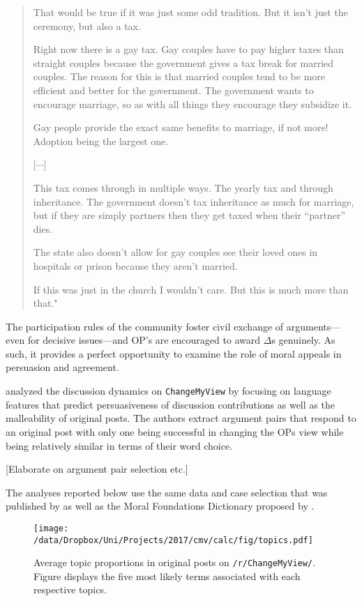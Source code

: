 \begin{quote}\singlespacing
That would be true if it was just some odd tradition. But it isn't just the ceremony, but also a tax.

Right now there is a gay tax. Gay couples have to pay higher taxes than straight couples because the government gives a tax break for married couples. The reason for this is that married couples tend to be more efficient and better for the government. The government wants to encourage marriage, so as with all things they encourage they subsidize it.

Gay people provide the exact same benefits to marriage, if not more! Adoption being the largest one.

[\hspace{.2em}$\cdots$]

This tax comes through in multiple ways. The yearly tax and through inheritance. The government doesn't tax inheritance as much for marriage, but if they are simply partners then they get taxed when their ``partner'' dies.

The state also doesn't allow for gay couples see their loved ones in hospitals or prison because they aren't married.

If this was just in the church I wouldn't care. But this is much more than that."
\end{quote}
The participation rules of the community foster civil exchange of arguments---even for decisive issues---and OP's are encouraged to award \(\Delta\)s genuinely. As such, it provides a perfect opportunity to examine the role of moral appeals in persuasion and agreement.

\citet{tan2016winning} analyzed the discussion dynamics on \texttt{ChangeMyView} by focusing on language features that predict persuasiveness of discussion contributions as well as the malleability of original posts. The authors extract argument pairs that respond to an original post with only one being successful in changing the OPs view while being relatively similar in terms of their word choice.

{[}Elaborate on argument pair selection etc.{]}

The analyses reported below use the same data and case selection that was published by \citet{tan2016winning} as well as the Moral Foundations Dictionary proposed by \citet{graham2009liberals}.


\begin{figure}
\centering
\texttt{[image: /data/Dropbox/Uni/Projects/2017/cmv/calc/fig/topics.pdf]}
\caption{Average topic proportions in original posts on \texttt{/r/ChangeMyView/}. Figure displays the five most likely terms associated with each respective topics.}
\end{figure}


